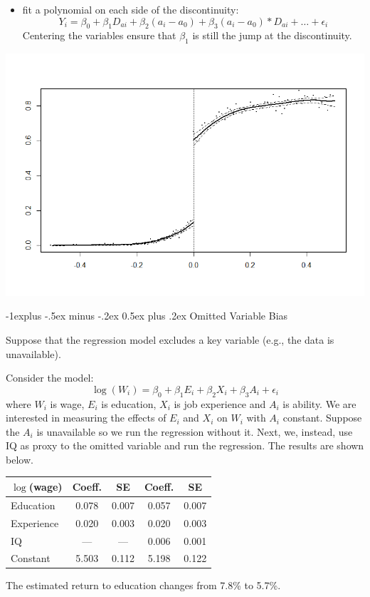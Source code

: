 \documentclass[a4paper,10pt,landscape]{article}
\makeatletter
\renewcommand{\subsection}{\@startsection{subsection}{2}{0mm}%
                                {-1explus -.5ex minus -.2ex}%
                                {0.5ex plus .2ex}%
                                {\normalfont\normalsize\bfseries}}
\makeatother
\begin{document}
\begin{multicols*}{3}
\begin{description}
\begin{itemize}
		\item fit a polynomial on each side of the discontinuity:
		$$Y_i=\beta_0+\beta_1D_{ai}+\beta_2(a_i-a_0)+\beta_3(a_i-a_0)*D_{ai}+\dots+\epsilon_i$$
		Centering the variables ensure that $\beta_1$ is still the jump at the discontinuity.
	\end{itemize}
	\begin{center}
		\includegraphics*[width=0.6\columnwidth, trim={0 0 0 1cm}, clip]{rdd.png}
	\end{center}
\end{description}

\subsection{Omitted Variable Bias}

\begin{description}
	\item Suppose that the regression model excludes a key variable (e.g., the data is unavailable).
	\item[Example:] Consider the model:
	$$\log(W_i)=\beta_0+\beta_1E_i+\beta_2X_i+\beta_3A_i+\epsilon_i$$
	where $W_i$ is wage, $E_i$ is education, $X_i$ is job experience and $A_i$ is ability. We are interested in measuring the effects of $E_i$ and $X_i$ on $W_i$ with $A_i$ constant. Suppose the $A_i$ is unavailable so we run the regression without it. Next, we, instead, use IQ as proxy to the omitted variable and run the regression. The results are shown below.
	\medskip
	
\begin{minipage}[h]{\columnwidth}
	\centering
	\begin{tabular}{lcc||cc}
		\toprule[\heavyrulewidth]\toprule[\heavyrulewidth]
		\textbf{$\log$(wage)}& \textbf{Coeff.} & \textbf{SE} & \textbf{Coeff.} & \textbf{SE} \\
		\midrule
		Education & {\color{red}0.078} & 0.007 & {\color{red}0.057} & 0.007\\
		Experience & 0.020 & 0.003 & 0.020 & 0.003 \\
		IQ & --- & --- & 0.006 & 0.001 \\
		Constant & 5.503 & 0.112 & 5.198 & 0.122\\
		\bottomrule[\heavyrulewidth]\bottomrule[\heavyrulewidth]
	\end{tabular}
\end{minipage}
	\item The estimated return to education changes from 7.8\% to 5.7\%.
\end{description}


\end{multicols*}
\end{document}
